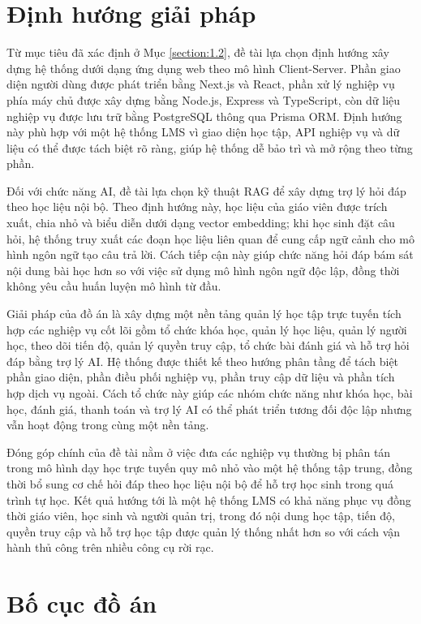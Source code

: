 \documentclass[../DoAn.tex]{subfiles}
\begin{document}
\section{Định hướng giải pháp}
\label{section:1.3}

Từ mục tiêu đã xác định ở Mục \ref{section:1.2}, đề tài lựa chọn định hướng xây dựng hệ thống dưới dạng ứng dụng web theo mô hình Client-Server. Phần giao diện người dùng được phát triển bằng Next.js và React, phần xử lý nghiệp vụ phía máy chủ được xây dựng bằng Node.js, Express và TypeScript, còn dữ liệu nghiệp vụ được lưu trữ bằng PostgreSQL thông qua Prisma ORM. Định hướng này phù hợp với một hệ thống LMS vì giao diện học tập, API nghiệp vụ và dữ liệu có thể được tách biệt rõ ràng, giúp hệ thống dễ bảo trì và mở rộng theo từng phần.

Đối với chức năng AI, đề tài lựa chọn kỹ thuật RAG để xây dựng trợ lý hỏi đáp theo học liệu nội bộ. Theo định hướng này, học liệu của giáo viên được trích xuất, chia nhỏ và biểu diễn dưới dạng vector embedding; khi học sinh đặt câu hỏi, hệ thống truy xuất các đoạn học liệu liên quan để cung cấp ngữ cảnh cho mô hình ngôn ngữ tạo câu trả lời. Cách tiếp cận này giúp chức năng hỏi đáp bám sát nội dung bài học hơn so với việc sử dụng mô hình ngôn ngữ độc lập, đồng thời không yêu cầu huấn luyện mô hình từ đầu.

Giải pháp của đồ án là xây dựng một nền tảng quản lý học tập trực tuyến tích hợp các nghiệp vụ cốt lõi gồm tổ chức khóa học, quản lý học liệu, quản lý người học, theo dõi tiến độ, quản lý quyền truy cập, tổ chức bài đánh giá và hỗ trợ hỏi đáp bằng trợ lý AI. Hệ thống được thiết kế theo hướng phân tầng để tách biệt phần giao diện, phần điều phối nghiệp vụ, phần truy cập dữ liệu và phần tích hợp dịch vụ ngoài. Cách tổ chức này giúp các nhóm chức năng như khóa học, bài học, đánh giá, thanh toán và trợ lý AI có thể phát triển tương đối độc lập nhưng vẫn hoạt động trong cùng một nền tảng.

Đóng góp chính của đề tài nằm ở việc đưa các nghiệp vụ thường bị phân tán trong mô hình dạy học trực tuyến quy mô nhỏ vào một hệ thống tập trung, đồng thời bổ sung cơ chế hỏi đáp theo học liệu nội bộ để hỗ trợ học sinh trong quá trình tự học. Kết quả hướng tới là một hệ thống LMS có khả năng phục vụ đồng thời giáo viên, học sinh và người quản trị, trong đó nội dung học tập, tiến độ, quyền truy cập và hỗ trợ học tập được quản lý thống nhất hơn so với cách vận hành thủ công trên nhiều công cụ rời rạc.

\section{Bố cục đồ án}
\label{section:1.4}
\end{document}
